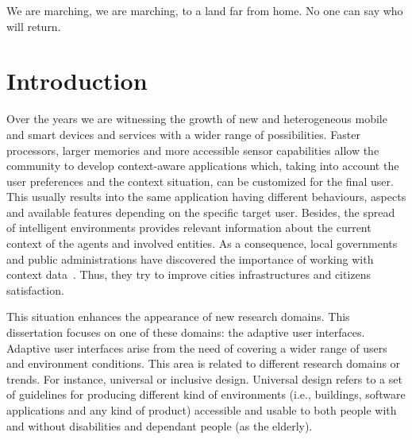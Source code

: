 \begin{savequote}[50mm]
We are marching, we are marching, to a land far from home. No one can say who will return.
\end{savequote}

\chapter{Introduction}
\label{cha:introduction}

\ifpdf
    \graphicspath{{1_introduction/figures/PNG/}{1_introduction/figures/PDF/}{1_introduction/figures/}}
\else
    \graphicspath{{1_introduction/figures/EPS/}{1_introduction/figures/}}
\fi


Over the years we are witnessing the growth of new and heterogeneous mobile and
smart devices and services with a wider range of possibilities. Faster processors,
larger memories and more accessible sensor capabilities allow the community to
develop context-aware applications which, taking into account the user preferences
and the context situation, can be customized for the final user. This usually
results into the same application having different behaviours, aspects and 
available features depending on the specific target user. Besides, the spread 
of intelligent environments provides relevant information about the current 
context of the agents and involved entities. As a consequence, local 
governments and public administrations have discovered the importance of 
working with context data~\citep{caragliu_smart_2009}. Thus, they try to 
improve cities infrastructures and citizens satisfaction.

This situation enhances the appearance of new research domains. This 
dissertation focuses on one of these domains: the adaptive user interfaces. 
Adaptive user interfaces arise from the need of covering a wider range of users 
and environment conditions. This area is related to different research domains 
or trends. For instance, universal or inclusive design. Universal design refers 
to a set of guidelines for producing different kind of environments (i.e., 
buildings, software applications and any kind of product) accessible and usable 
to both people with and without disabilities and dependant people (as the 
elderly).

